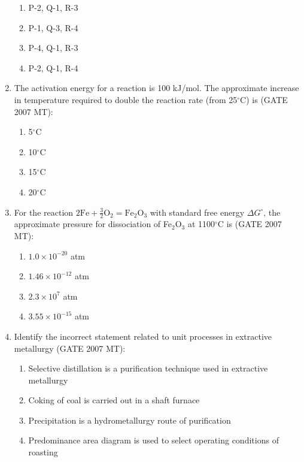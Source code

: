 \documentclass[12pt]{article}
\begin{document}
\begin{enumerate}
  \begin{enumerate}[label=(\Alph*)]
    \item P-2, Q-1, R-3
    \item P-1, Q-3, R-4
    \item P-4, Q-1, R-3
    \item P-2, Q-1, R-4
  \end{enumerate}

\setcounter{enumi}{47}

\item The activation energy for a reaction is 100 kJ/mol. The approximate increase in temperature required to double the reaction rate (from 25$^\circ$C) is (GATE 2007 MT):  
  \begin{enumerate}[label=(\Alph*)]
    \item 5$^\circ$C
    \item 10$^\circ$C
    \item 15$^\circ$C
    \item 20$^\circ$C
  \end{enumerate}

\item For the reaction $2\mathrm{Fe} + \frac{3}{2}\mathrm{O}_2 = \mathrm{Fe}_2\mathrm{O}_3$ with standard free energy $\Delta G^\circ$, the approximate pressure for dissociation of Fe$_2$O$_3$ at 1100$^\circ$C is (GATE 2007 MT):  
  \begin{enumerate}[label=(\Alph*)]
    \item $1.0 \times 10^{-20}$ atm
    \item $1.46 \times 10^{-12}$ atm
    \item $2.3 \times 10^{7}$ atm
    \item $3.55 \times 10^{-15}$ atm
  \end{enumerate}

\item Identify the incorrect statement related to unit processes in extractive metallurgy (GATE 2007 MT):  
  \begin{enumerate}[label=(\Alph*)]
    \item Selective distillation is a purification technique used in extractive metallurgy
    \item Coking of coal is carried out in a shaft furnace
    \item Precipitation is a hydrometallurgy route of purification
    \item Predominance area diagram is used to select operating conditions of roasting
  \end{enumerate}


\end{enumerate}
\end{document}
